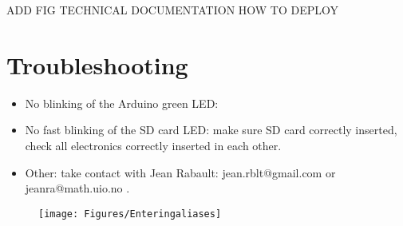 \documentclass[pdftex,a4paper,12pt,twocolumn,fleqn,captions=tableheading]{scrartcl}
\begin{document}
ADD FIG TECHNICAL DOCUMENTATION HOW TO DEPLOY

\section{Troubleshooting}

\begin{itemize}
  \item No blinking of the Arduino green LED:

  \item No fast blinking of the SD card LED: make sure SD card correctly inserted, check all electronics correctly inserted in each other.

  \item Other: take contact with Jean Rabault: jean.rblt@gmail.com or jeanra@math.uio.no .
\end{itemize}

\begin{figure}
\begin{center}
\texttt{[image: Figures/Enteringaliases]}
\caption{\label{Spreadsheet}}
\end{center}
\end{figure}
\end{document}
